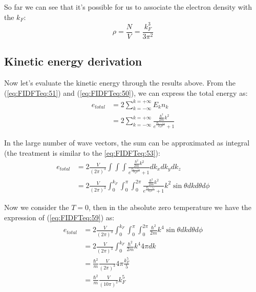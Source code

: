 So far we can see that it's possible for us to associate the electron
density with the $k_{F}$:
\begin{equation}
  \label{eq:FIDFTeq:57}
\rho = \frac{N}{V} = \frac{k_{F}^{3}}{3\pi^{2}}
\end{equation}


\subsection{Kinetic energy derivation}
\label{KED_in_function}
%
%
%
%
Now let's evaluate the kinetic energy through the results above. From
the (\ref{eq:FIDFTeq:51}) and (\ref{eq:FIDFTeq:50}), we can express
the total energy as:
\begin{align}
  \label{eq:FIDFTeq:58}
e_{total} &= 2\sum_{k=-\infty}^{k=+\infty}E_{k}n_{k} \nonumber \\
        &= 2\sum_{k=-\infty}^{k=+\infty}
          \frac{\frac{\hbar^{2}}{2m}k^{2}}{e^{\frac{E_{k}-\epsilon_{F}}{k_{B}T}}
    + 1}
\end{align}

In the large number of wave vectors, the sum can be approximated as
integral (the treatment is similar to the \ref{eq:FIDFTeq:53}):
\begin{align}
  \label{eq:FIDFTeq:59}
e_{total} &= 2\frac{V}{(2\pi)^{3}}\int \int \int
\frac{\frac{\hbar^{2}}{2m}k^{2}}{e^{\frac{E_{k}-\epsilon_{F}}{k_{B}T}}
     + 1}dk_{x}dk_{y}dk_{z} \nonumber \\
&=  2\frac{V}{(2\pi)^{3}}
\int_{0}^{k_{F}}\int_{0}^{\pi}\int_{0}^{2\pi}
\frac{\frac{\hbar^{2}}{2m}k^{2}}{e^{\frac{E_{k}-\epsilon_{F}}{k_{B}T}}
+ 1}k^{2}\sin\theta dkd\theta d\phi
\end{align}

Now we consider the $T = 0$, then in the absolute zero temperature we
have the expression of (\ref{eq:FIDFTeq:59}) as:
\begin{align}
  \label{eq:FIDFTeq:60}
e_{total} &= 2\frac{V}{(2\pi)^{3}}
\int_{0}^{k_{F}}\int_{0}^{\pi}\int_{0}^{2\pi}
\frac{\hbar^{2}}{2m}k^{4}\sin\theta dkd\theta d\phi \nonumber \\
&=  2\frac{V}{(2\pi)^{3}}
\int_{0}^{k_{F}}\frac{\hbar^{2}}{2m}k^{4}4\pi dk \nonumber \\
&= \frac{\hbar^{2}}{m} \frac{V}{(2\pi)^{3}}4\pi\frac{k_{F}^{5}}{5}
\nonumber \\
&= \frac{\hbar^{2}}{m} \frac{V}{(10\pi)^{2}}k_{F}^{5}
\end{align}

